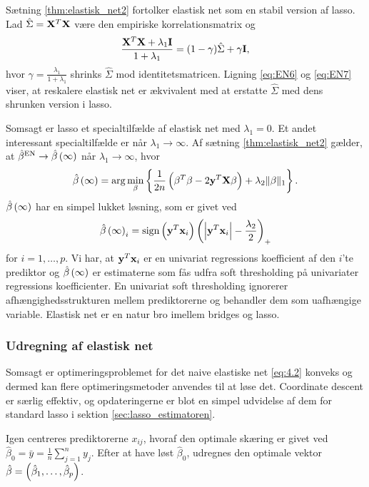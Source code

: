 %
Sætning \ref{thm:elastisk_net2} fortolker elastisk net som en stabil version af lasso.
Lad \(\hat{\Sigma} = \mathbf{X}^T \mathbf{X}\) være den empiriske korrelationsmatrix og
\begin{align*}
\frac{\mathbf{X}^T \mathbf{X} + \lambda_1 \mathbf{I}}{1 + \lambda_1} = (1-\gamma) \hat{\Sigma} + \gamma \mathbf{I},
\end{align*}
hvor \(\gamma=\frac{\lambda_1}{1+\lambda_1}\) shrinks \(\hat{\Sigma}\) mod identitetsmatricen.
Ligning \eqref{eq:EN6} og \eqref{eq:EN7} viser, at reskalere elastisk net er ækvivalent med at erstatte \(\hat{\Sigma}\) med dens shrunken version i lasso.


Somsagt er lasso et specialtilfælde af elastisk net med \(\lambda_1=0\). 
Et andet interessant specialtilfælde er når \(\lambda_1 \rightarrow \infty\).
Af sætning \ref{thm:elastisk_net2} gælder, at \(\hat{\beta}^\text{EN} \rightarrow \hat{\beta} \del{\infty}\) når \(\lambda_1 \rightarrow \infty\), hvor
\begin{align*}
\hat{\beta} \del{\infty} = \arg \min_\beta \cbr{\frac{1}{2n} \del{\beta^T \beta - 2 \y^T \X \beta} + \lambda_2 \Vert \beta \Vert_1}.
\end{align*}
\(\hat{\beta} \del{\infty}\) har en simpel lukket løsning, som er givet ved
\begin{align*}
\hat{\beta} \del{\infty}_i = \text{sign} \del{\y^T \mathbf{x}_i} \del{\left\vert \y^T \mathbf{x}_i \right\vert - \frac{\lambda_2}{2}}_+
\end{align*}
for \(i = 1, \ldots, p\).
Vi har, at \(\mathbf{y}^T \mathbf{x}_i\) er en univariat regressions koefficient af den \(i\)'te prediktor og \(\hat{\beta} \del{\infty}\) er estimaterne som fås udfra soft thresholding på univariater regressions koefficienter.
En univariat soft thresholding ignorerer afhængighedsstrukturen mellem prediktorerne og behandler dem som uafhængige variable.
Elastisk net er en natur bro imellem bridges og lasso.

\subsubsection{Udregning af elastisk net}
Somsagt er optimeringsproblemet for det naive elastiske net \eqref{eq:4.2} konveks og dermed kan flere optimeringsmetoder anvendes til at løse det.
Coordinate descent er særlig effektiv, og opdateringerne er blot en simpel udvidelse af dem for standard lasso i sektion \ref{sec:lasso_estimatoren}.

Igen centreres prediktorerne \(x_{ij}\), hvoraf den optimale skæring er givet ved \(\hat{\beta}_0=\bar{y}=\frac{1}{n} \sum_{j=1}^n y_j\).
Efter at have løst \(\hat{\beta}_0\), udregnes den optimale vektor \(\hat{\beta}= \del{\hat{\beta}_1, \ldots, \hat{\beta}_p}\).

